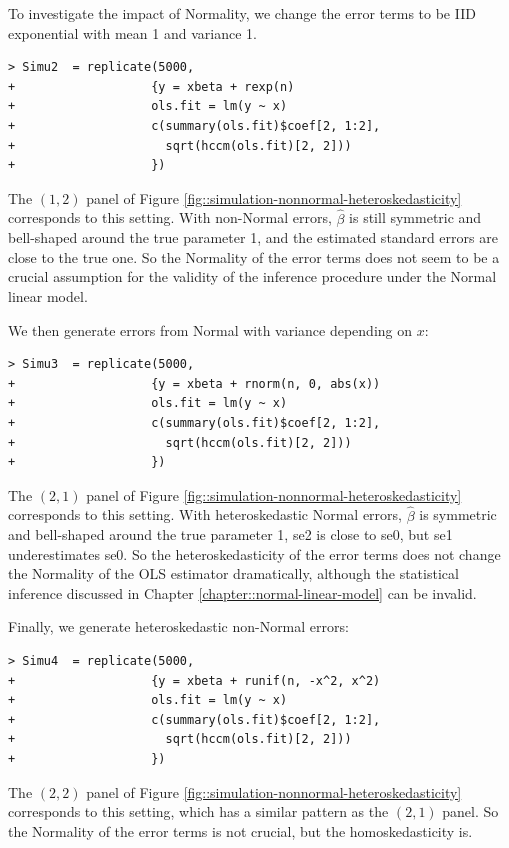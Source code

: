 To investigate the impact of Normality, we change the error terms to be IID exponential with mean 1 and variance 1. 

\begin{lstlisting}
> Simu2  = replicate(5000,
+                   {y = xbeta + rexp(n)
+                   ols.fit = lm(y ~ x)
+                   c(summary(ols.fit)$coef[2, 1:2],
+                     sqrt(hccm(ols.fit)[2, 2]))
+                   })
\end{lstlisting}

The $(1,2)$ panel of Figure \ref{fig::simulation-nonnormal-heteroskedasticity} corresponds to this setting. With non-Normal errors, $\hat{\beta}$ is still symmetric and bell-shaped around the true parameter 1, and the estimated standard errors are close to the true one. So the Normality of the error terms does not seem to be a crucial assumption for the validity of the inference procedure under the Normal linear model. 



We then generate errors from Normal with variance depending on $x$:
\begin{lstlisting}
> Simu3  = replicate(5000,
+                   {y = xbeta + rnorm(n, 0, abs(x))
+                   ols.fit = lm(y ~ x)
+                   c(summary(ols.fit)$coef[2, 1:2],
+                     sqrt(hccm(ols.fit)[2, 2]))
+                   })
\end{lstlisting}
The $(2,1)$ panel of Figure \ref{fig::simulation-nonnormal-heteroskedasticity} corresponds to this setting. With heteroskedastic Normal errors, $\hat{\beta}$ is symmetric and bell-shaped around the true parameter 1, se2 is close to se0, but se1 underestimates se0. So the heteroskedasticity of the error terms does not change the Normality of the OLS estimator dramatically, although the statistical inference discussed in Chapter \ref{chapter::normal-linear-model} can be invalid. 
 
 
Finally, we generate heteroskedastic non-Normal errors:
\begin{lstlisting}
> Simu4  = replicate(5000,
+                   {y = xbeta + runif(n, -x^2, x^2)
+                   ols.fit = lm(y ~ x)
+                   c(summary(ols.fit)$coef[2, 1:2],
+                     sqrt(hccm(ols.fit)[2, 2]))
+                   })
\end{lstlisting} 
The  $(2,2)$ panel of Figure \ref{fig::simulation-nonnormal-heteroskedasticity} corresponds to this setting, which has a similar pattern as the $(2,1)$ panel. So the Normality of the error terms is not crucial, but the homoskedasticity is. 



